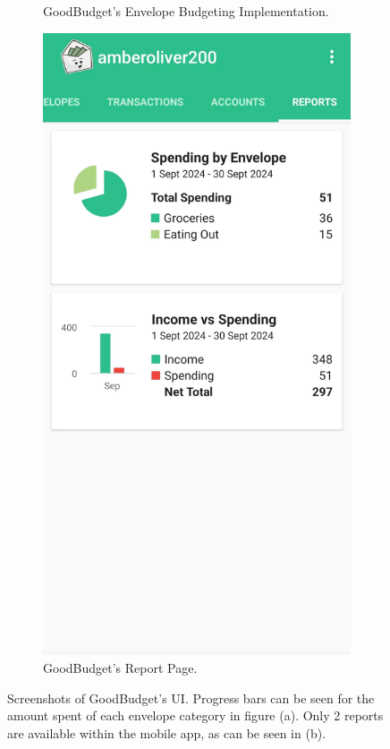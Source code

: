 \documentclass{l4proj}
\begin{document}
\begin{appendices}
\begin{figure}[h]
\begin{subfigure}[t]{0.25\textwidth}
        \caption{GoodBudget's Envelope Budgeting Implementation.}
        \label{fig:syn1}
    \end{subfigure}
    \hspace{0.5cm}
    \begin{subfigure}[t]{0.25\textwidth}
        \vspace{0pt}
        \includegraphics[width=\textwidth]{images/App-Comparison/goodbudget-ss-1.png} 
        \caption{GoodBudget's Report Page.}
        \label{fig:syn2}
    \end{subfigure}
    \caption{Screenshots of GoodBudget's UI. Progress bars can be seen for the amount spent of each envelope category in figure (a). Only 2 reports are available within the mobile app, as can be seen in (b).}
    \label{fig:synthetic}
\end{figure}


\end{appendices}
\end{document}
